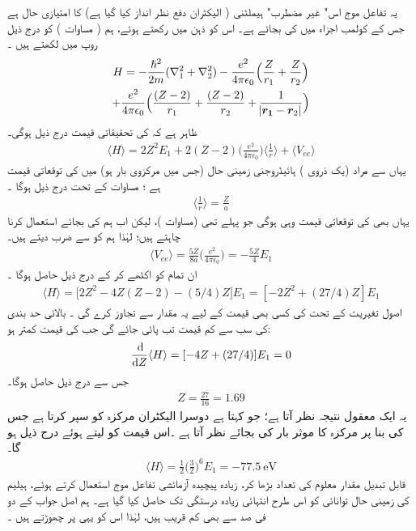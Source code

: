  
یہ تفاعل موج اس" غیر مضطرب"   ہیملٹنی  ( الیکٹران   دفع  نظر انداز کیا گیا ہے)   کا امتیازی حال ہے  جس کے  کولمب اجزاء  میں  کی بجائے  ہے۔ اس کو ذہن میں رکھتے ہوئے،   ہم    ( مساوات ) کو درج ذیل روپ میں   لکھتے ہیں ۔
\begin{multline}
H=-\frac{\hslash^{2}}{2m}(\nabla_{1}^{2}+\nabla_{2}^{2})-\frac{e^{2}}{4\pi\epsilon_{0}}\Big(\frac{Z}{r_{1}}+\frac{Z}{r_{2}}\Big)\\
+\frac{e^{2}}{4\pi\epsilon_{0}}\Big(\frac{(Z-2)}{r_{1}}+\frac{(Z-2)}{r_{2}}+\frac{1}{\abs{{{\boldsymbol{r_{1}}}}-{{\boldsymbol{r}}}_{2}}}\Big)
\end{multline}
 ظاہر ہے کہ کی تحقیقاتی قیمت درج ذیل ہوگی۔
\begin{align}
\langle H \rangle = 2Z^{2}E_{1}+2(Z-2)\big(\frac{e^{2}}{4\pi\epsilon_{0}}\big)\big\langle \frac{1}{r}\big\rangle + \langle V_{ee} \rangle 
\end{align}
 یہاں  سے مراد (یک ذروی  ) ہائیڈروجنی  زمینی حال    (جس میں مرکزوی بار   ہو)  میں  کی  توقعاتی   قیمت ہے ؛ مساوات  کے تحت درج ذیل ہوگا ۔
\begin{align}
\big\langle \frac{1}{r} \big\rangle = \frac{Z}{a} 
\end{align}
 یہاں بھی   کی توقعاتی قیمت وہی ہوگی جو پہلے تھی (مساوات   )،   لیکن اب ہم   کی بجائے     استعمال کرنا چاہتے ہیں؛  لہٰذا ہم   کو    سے ضرب دیتے ہیں۔ 
 \begin{align}
\langle V_{ee} \rangle =\frac{5Z}{8a}\big(\frac{e^{2}}{4\pi\epsilon_{0}}\big)=-\frac{5Z}{4}E_{1} 
\end{align}
  ان تمام کو اکٹھے کر کے  درج ذیل حاصل ہوگا ۔
 \begin{align}
\langle H \rangle =\big[2Z^{2}-4Z(Z-2)-(5/4)Z\big]E_{1}=[-2Z^{2}+(27/4)Z]E_{1} 
\end{align}
 اصول تغیریت کے تحت  کی کسی بھی  قیمت کے لیے یہ مقدار   سے تجاوز کرے گی ۔ بالائی حد بندی کی سب سے کم قیمت تب پائی جائے  گی جب    کی قیمت  کمتر  ہو:
\begin{align*}
\frac{\dif}{\dif Z}\langle H \rangle =[-4Z+(27/4)]E_{1}=0
\end{align*}
 جس سے درج ذیل حاصل ہوگا۔
\begin{align}
Z=\frac{27}{16}=1.69
\end{align}
 یہ ایک معقول نتیجہ نظر آتا ہے؛  جو کہتا ہے دوسرا الیکٹران مرکزہ کو سپر کرتا ہے جس کی بنا پر مرکزہ کا موثر بار   کی بجائے   نظر آتا ہے ۔اس قیمت کو   لیتے ہوئے درج ذیل ہو گا۔
\begin{align}
\langle H \rangle =\frac{1}{2}\big(\frac{3}{2}\big)^{6}E_{1}=\SI{-77.5}{\electronvolt}
\end{align}
 قابل تبدیل مقدار  معلوم کی تعداد بڑھا کر،  زیادہ پیچیدہ آزمائشی تفاعل موج  استعمال کرتے ہوئے،  ہیلیم کی زمینی حال توانائی کو اس طرح  انتہائی زیادہ درستگی تک حاصل کیا گیا ہے۔ ہم اصل  جواب کے دو فی صد سے بھی کم   قریب   ہیں،  لہٰذا اس کو یہی پر چھوڑتے ہیں ۔
 
